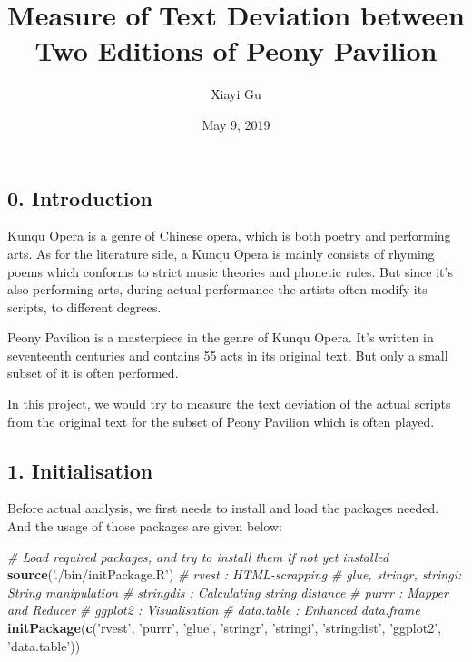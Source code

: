 \documentclass[]{article}
\title{Measure of Text Deviation between Two Editions of Peony Pavilion}
\author{Xiayi Gu}
\date{May 9, 2019}
\newenvironment{Shaded}{\begin{snugshade}}{\end{snugshade}}
\newcommand{\CommentTok}[1]{\textcolor[rgb]{0.56,0.35,0.01}{\textit{#1}}}
\newcommand{\KeywordTok}[1]{\textcolor[rgb]{0.13,0.29,0.53}{\textbf{#1}}}
\newcommand{\NormalTok}[1]{#1}
\newcommand{\StringTok}[1]{\textcolor[rgb]{0.31,0.60,0.02}{#1}}
\begin{document}
\maketitle

\hypertarget{introduction}{%
\subsection{0. Introduction}\label{introduction}}

Kunqu Opera is a genre of Chinese opera, which is both poetry and
performing arts. As for the literature side, a Kunqu Opera is mainly
consists of rhyming poems which conforms to strict music theories and
phonetic rules. But since it's also performing arts, during actual
performance the artists often modify its scripts, to different degrees.

Peony Pavilion is a masterpiece in the genre of Kunqu Opera. It's
written in seventeenth centuries and contains 55 acts in its original
text. But only a small subset of it is often performed.

In this project, we would try to measure the text deviation of the
actual scripts from the original text for the subset of Peony Pavilion
which is often played.

\hypertarget{initialisation}{%
\subsection{1. Initialisation}\label{initialisation}}

Before actual analysis, we first needs to install and load the packages
needed. And the usage of those packages are given below:

\begin{Shaded}
\begin{Highlighting}[]
\CommentTok{# Load required packages, and try to install them if not yet installed}
\KeywordTok{source}\NormalTok{(}\StringTok{'./bin/initPackage.R'}\NormalTok{)}
\CommentTok{# rvest                 : HTML-scrapping}
\CommentTok{# glue, stringr, stringi: String manipulation}
\CommentTok{# stringdis             : Calculating string distance}
\CommentTok{# purrr                 : Mapper and Reducer}
\CommentTok{# ggplot2               : Visualisation}
\CommentTok{# data.table            : Enhanced data.frame}
\KeywordTok{initPackage}\NormalTok{(}\KeywordTok{c}\NormalTok{(}\StringTok{'rvest'}\NormalTok{, }\StringTok{'purrr'}\NormalTok{, }\StringTok{'glue'}\NormalTok{, }\StringTok{'stringr'}\NormalTok{, }\StringTok{'stringi'}\NormalTok{, }\StringTok{'stringdist'}\NormalTok{,}
              \StringTok{'ggplot2'}\NormalTok{, }\StringTok{'data.table'}\NormalTok{))}
\end{Highlighting}
\end{Shaded}
\end{document}
